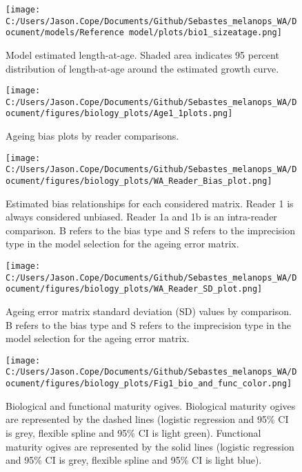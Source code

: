 \documentclass[11pt,
  english,
  letterpaper,
]{article}
\begin{document}
\begin{figure}
\centering
\texttt{[image: C:/Users/Jason.Cope/Documents/Github/Sebastes\_melanops\_WA/Document/models/Reference model/plots/bio1\_sizeatage.png]}
\caption{Model estimated length-at-age. Shaded area indicates 95 percent distribution of length-at-age around the estimated growth curve.\label{fig:len-age-ss}}
\end{figure}

\clearpage

\begin{figure}
\centering
\texttt{[image: C:/Users/Jason.Cope/Documents/Github/Sebastes\_melanops\_WA/Document/figures/biology\_plots/Age1\_1plots.png]}
\caption{Ageing bias plots by reader comparisons.\label{fig:age-bias_plot}}
\end{figure}

\begin{figure}
\centering
\texttt{[image: C:/Users/Jason.Cope/Documents/Github/Sebastes\_melanops\_WA/Document/figures/biology\_plots/WA\_Reader\_Bias\_plot.png]}
\caption{Estimated bias relationships for each considered matrix. Reader 1 is always considered unbiased. Reader 1a and 1b is an intra-reader comparison. B refers to the bias type and S refers to the imprecision type in the model selection for the ageing error matrix.\label{fig:age-error-bias}}
\end{figure}

\begin{figure}
\centering
\texttt{[image: C:/Users/Jason.Cope/Documents/Github/Sebastes\_melanops\_WA/Document/figures/biology\_plots/WA\_Reader\_SD\_plot.png]}
\caption{Ageing error matrix standard deviation (SD) values by comparison. B refers to the bias type and S refers to the imprecision type in the model selection for the ageing error matrix.\label{fig:age-error-sd}}
\end{figure}

\begin{figure}
\centering
\texttt{[image: C:/Users/Jason.Cope/Documents/Github/Sebastes\_melanops\_WA/Document/figures/biology\_plots/Fig1\_bio\_and\_func\_color.png]}
\caption{Biological and functional maturity ogives. Biological maturity ogives are represented by the dashed lines (logistic regression and 95\% CI is grey, flexible spline and 95\% CI is light green). Functional maturity ogives are represented by the solid lines (logistic regression and 95\% CI is grey, flexible spline and 95\% CI is light blue).\label{fig:bio-fxn-mat-color}}
\end{figure}
\end{document}
